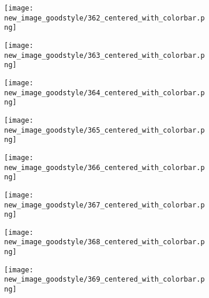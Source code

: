 \documentclass[a4paper,12pt]{article}
\begin{document}
\begin{figure}[H]
  \begin{subfigure}{0.11\textwidth}
    \texttt{[image: new\_image\_goodstyle/362\_centered\_with\_colorbar.png]}
  \end{subfigure}
  \hfill
  \begin{subfigure}{0.11\textwidth}
    \texttt{[image: new\_image\_goodstyle/363\_centered\_with\_colorbar.png]}
  \end{subfigure}
  \hfill
  \begin{subfigure}{0.11\textwidth}
    \texttt{[image: new\_image\_goodstyle/364\_centered\_with\_colorbar.png]}
  \end{subfigure}
  \hfill
  \begin{subfigure}{0.11\textwidth}
    \texttt{[image: new\_image\_goodstyle/365\_centered\_with\_colorbar.png]}
  \end{subfigure}
  \hfill
  \begin{subfigure}{0.11\textwidth}
    \texttt{[image: new\_image\_goodstyle/366\_centered\_with\_colorbar.png]}
  \end{subfigure}
  \hfill
  \begin{subfigure}{0.11\textwidth}
    \texttt{[image: new\_image\_goodstyle/367\_centered\_with\_colorbar.png]}
  \end{subfigure}
  \hfill
  \begin{subfigure}{0.11\textwidth}
    \texttt{[image: new\_image\_goodstyle/368\_centered\_with\_colorbar.png]}
  \end{subfigure}
  \hfill
  \begin{subfigure}{0.11\textwidth}
    \texttt{[image: new\_image\_goodstyle/369\_centered\_with\_colorbar.png]}
  \end{subfigure}
  \hfill
\end{figure}
\end{document}
